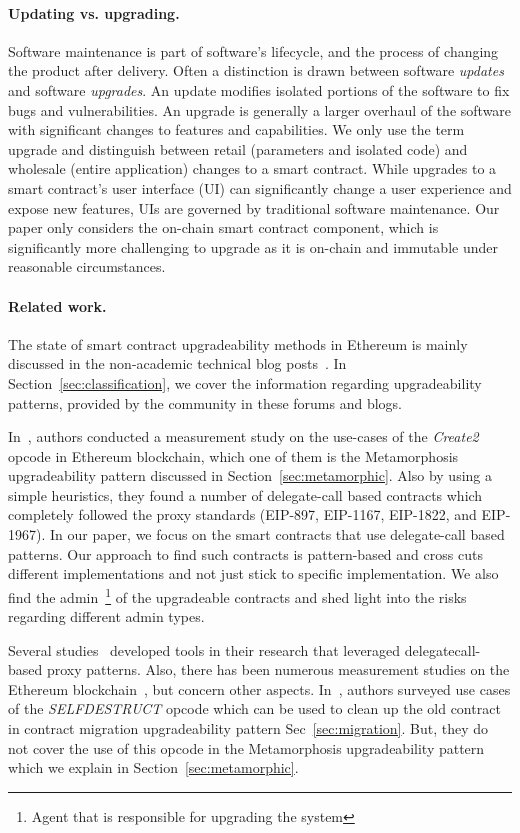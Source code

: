 \paragraph{Updating vs. upgrading.} Software maintenance is part of software's lifecycle, and the process of changing the product after delivery. Often a distinction is drawn between software \textit{updates} and software \textit{upgrades}. An update modifies isolated portions of the software to fix bugs and vulnerabilities. An upgrade is generally a larger overhaul of the software with significant changes to features and capabilities. We only use the term upgrade and distinguish between retail (parameters and isolated code) and wholesale (entire application) changes to a smart contract. While upgrades to a smart contract's user interface (UI) can significantly change a user experience and expose new features, UIs are governed by traditional software maintenance. Our paper only considers the on-chain smart contract component, which is significantly more challenging to upgrade as it is on-chain and immutable under reasonable circumstances. 

\paragraph{Related work.} 

The state of smart contract upgradeability methods in Ethereum is mainly discussed in the non-academic technical blog posts~\cite{openzeppelinPost,tobBlogPost}. In Section~\ref{sec:classification}, we cover the information regarding upgradeability patterns, provided by the community in these forums and blogs.

In~\cite{frowisnot}, authors conducted a measurement study on the use-cases of the \textit{Create2} opcode in Ethereum blockchain, which one of them is the Metamorphosis upgradeability pattern discussed in Section~\ref{sec:metamorphic}. Also by using a simple heuristics, they found a number of delegate-call based contracts which completely followed the proxy standards (EIP-897, EIP-1167, EIP-1822, and EIP-1967). In our paper, we focus on the smart contracts that use delegate-call based patterns. Our approach to find such contracts is pattern-based and cross cuts different implementations and not just stick to specific implementation. We also find the admin~\footnote{Agent that is responsible for upgrading the system} of the upgradeable contracts and shed light into the risks regarding different admin types.

Several studies~\cite{rodler2021evmpatch,perez2022dissimilar} developed tools in their research that leveraged delegatecall-based proxy patterns. Also, there has been numerous measurement studies on the Ethereum blockchain~\cite{perez2019broken,chen2017adaptive,reijsbergen2021transaction,victor2019measuring,pinna2019massive,he2020characterizing}, but concern other aspects. In~\cite{chen2021smart}, authors surveyed use cases of the \textit{SELFDESTRUCT} opcode which can be used to clean up the old contract in contract migration upgradeability pattern Sec~\ref{sec:migration}. But, they do not cover the use of this opcode in the Metamorphosis upgradeability pattern which we explain in Section~\ref{sec:metamorphic}.



